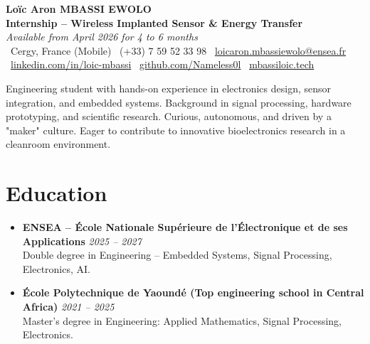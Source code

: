 \documentclass[a4paper,11pt]{article}
\begin{document}
\begin{center}
    {\Large \textbf{Loïc Aron MBASSI EWOLO}} \\ \vspace{4pt}
    \textbf{\large Internship -- Wireless Implanted Sensor \& Energy Transfer} \\
    \textit{\small Available from April 2026 for 4 to 6 months} \\ \vspace{4pt}
    \small
    \faMapMarker\ Cergy, France (Mobile) \quad
    \faPhone\ (+33) 7 59 52 33 98 \quad
    {\color{primary}\faEnvelope\ \href{mailto:loicaron.mbassiewolo@ensea.fr}{loicaron.mbassiewolo@ensea.fr}} \\ \vspace{2pt}
    {\color{primary}\faLinkedin\ \href{https://www.linkedin.com/in/loic-mbassi/}{linkedin.com/in/loic-mbassi}} \quad
    {\color{primary}\faGithub\ \href{https://github.com/Nameless0l}{github.com/Nameless0l}} \quad
    {\color{primary}\faGlobe\ \href{https://mbassiloic.tech}{mbassiloic.tech}}
\end{center}

\vspace{-6pt}

\noindent\small{Engineering student with hands-on experience in electronics design, sensor integration, and embedded systems. Background in signal processing, hardware prototyping, and scientific research. Curious, autonomous, and driven by a "maker" culture. Eager to contribute to innovative bioelectronics research in a cleanroom environment.}

\section{Education}
\begin{itemize}[leftmargin=*, label=\tiny$\bullet$, nosep]
    \item \textbf{ENSEA -- École Nationale Supérieure de l'Électronique et de ses Applications} \hfill \textit{2025 -- 2027} \\
    \small{Double degree in Engineering -- Embedded Systems, Signal Processing, Electronics, AI.}
    \item \textbf{École Polytechnique de Yaoundé (Top engineering school in Central Africa)} \hfill \textit{2021 -- 2025} \\
    \small{Master's degree in Engineering: Applied Mathematics, Signal Processing, Electronics.}
\end{itemize}
\end{document}
